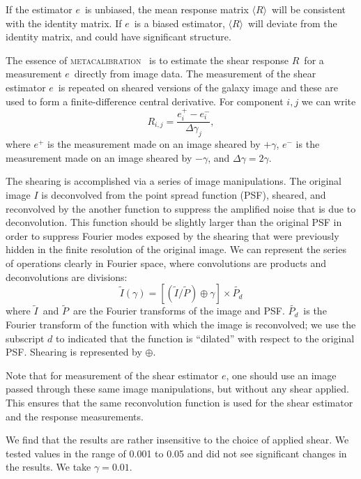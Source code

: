 \documentclass[iop]{emulateapj}
\newcommand{\vest}{\mbox{\boldmath $e$}}
\newcommand{\est}{e}
\newcommand{\mcal}{\textsc{metacalibration}}
\newcommand{\mcalR}{\mbox{\boldmath $R$}}
\newcommand{\mcalRmean}{\mbox{\boldmath $\langle R \rangle$}}
\newcommand{\Itild}{\mbox{$\widetilde{I}$}}
\newcommand{\Ptil}{\mbox{$\widetilde{P}$}}
\newcommand{\Ptild}{\mbox{$\widetilde{P_d}$}}
\begin{document}
If the estimator \vest\ is unbiased, the mean response matrix \mcalRmean\
will be consistent with the identity matrix.  If \vest\ is a biased
estimator, \mcalRmean\ will deviate from the identity matrix,
and could have significant structure.


The essence of \mcal\ \citep{HuffMcal} is to estimate the shear response
\mcalR\ for a measurement \vest\ directly from image data.  The measurement of
the shear estimator \vest\ is repeated on sheared versions of the galaxy
image and these are used to form a finite-difference central derivative.
For component $i,j$ we can write
\begin{equation} \label{eq:Rnum}
    R_{i,j} = \frac{\est_i^+ - \est_i^-}{\Delta \gamma_j},
\end{equation}
where $\est^+$ is the measurement made on an image sheared by $+\gamma$,
$\est^-$ is the measurement made on an image sheared by $-\gamma$,
and $\Delta \gamma = 2\gamma$.

The shearing is accomplished via a series of image manipulations. The original
image $I$ is deconvolved from the point spread function (PSF), sheared, and
reconvolved by the another function to suppress the amplified noise that is due to
deconvolution.  This function should be slightly larger than the original PSF
in order to suppress Fourier modes exposed by the shearing that were
previously hidden in the finite resolution of the original image.  We can
represent the series of operations clearly in Fourier space, where
convolutions are products and deconvolutions are divisions:
\begin{equation}
    \Itild(\gamma) = \left[ \left( \Itild/\Ptil \right) \oplus \gamma \right] \times \Ptild
\end{equation}
where \Itild\ and \Ptil\ are the Fourier transforms of the image and PSF.
\Ptild\ is the Fourier transform of the function with which the image
is reconvolved; we use the subscript $d$ to indicated that the function
is ``dilated'' with respect to the original PSF.
Shearing is represented by $\oplus$.

Note that for measurement of the shear estimator \vest, one should use an image
passed through these same image manipulations, but without any shear applied.
This ensures that the same reconvolution function is used for the shear
estimator and the response measurements.

We find that the results are rather insensitive to the choice of applied shear.
We tested values in the range of 0.001 to 0.05 and did not see significant
changes in the results. We take $\gamma=0.01$.
\end{document}
